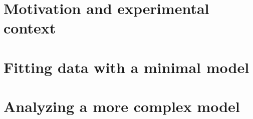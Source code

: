\section{Motivation and experimental context}

\section{Fitting data with a minimal model}

\section{Analyzing a more complex model}